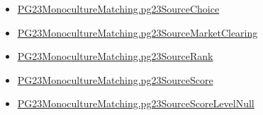 \documentclass[10pt]{article}
\begin{document}
\begin{itemize}
\item \hyperlink{paper-prerequisite-1c7877b588e0c9b6}{PG23\allowbreak{}Monoculture\allowbreak{}Matching.\allowbreak{}pg23\allowbreak{}Source\allowbreak{}Choice}
\item \hyperlink{paper-prerequisite-55bbf5d44984bdf1}{PG23\allowbreak{}Monoculture\allowbreak{}Matching.\allowbreak{}pg23\allowbreak{}Source\allowbreak{}Market\allowbreak{}Clearing}
\item \hyperlink{paper-prerequisite-5b8974902ba221f5}{PG23\allowbreak{}Monoculture\allowbreak{}Matching.\allowbreak{}pg23\allowbreak{}Source\allowbreak{}Rank}
\item \hyperlink{paper-prerequisite-9b09ee190ab81202}{PG23\allowbreak{}Monoculture\allowbreak{}Matching.\allowbreak{}pg23\allowbreak{}Source\allowbreak{}Score}
\item \hyperlink{paper-prerequisite-26aa95cb7c69a47b}{PG23\allowbreak{}Monoculture\allowbreak{}Matching.\allowbreak{}pg23\allowbreak{}Source\allowbreak{}Score\allowbreak{}Level\allowbreak{}Null}
\end{itemize}
\end{document}
